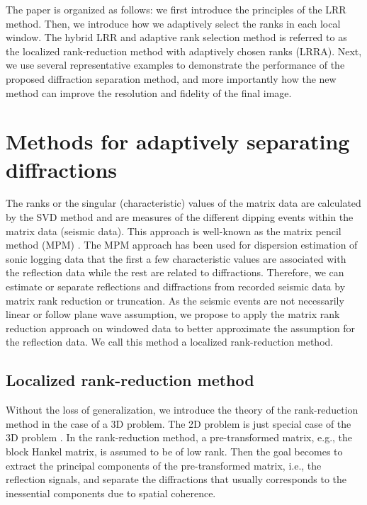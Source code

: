 The paper is organized as follows: we first introduce the principles of the LRR method. Then, we introduce how we adaptively select the ranks in each local window. The hybrid LRR and adaptive rank selection method is referred to as the localized rank-reduction method with adaptively chosen ranks (LRRA). Next, we use several representative examples to demonstrate the performance of the proposed diffraction separation method, and more importantly how the new method can improve the resolution and fidelity of the final image. 

\section{Methods for adaptively separating diffractions}
The ranks or the singular (characteristic) values of the matrix data are calculated by the SVD method and are measures of the different dipping events within the matrix data (seismic data). This approach is well-known as the matrix pencil method (MPM) \cite[]{jain1974filter,hua1991svd,sarkar1995using}. The MPM approach has been used for dispersion estimation of sonic logging data \cite[]{lang1987estimating,ekstrom1996dispersion} that the first a few characteristic values are associated with the reflection data while the rest are related to diffractions. Therefore, we can estimate or separate reflections and diffractions from recorded seismic data by matrix rank reduction or truncation. As the seismic events are not necessarily linear or follow plane wave assumption, we propose to apply the matrix rank reduction approach on windowed data to better approximate the  assumption for the reflection data. We call this method a localized rank-reduction method.
\subsection{Localized rank-reduction method}
%
Without the loss of generalization, we introduce the theory of the rank-reduction method in the case of a 3D problem. The 2D problem is just special case of the 3D problem . In the rank-reduction method, a pre-transformed matrix, e.g., the block Hankel matrix, is assumed to be of low rank. Then the goal becomes to extract the principal components of the pre-transformed matrix, i.e., the reflection signals, and separate the diffractions that usually corresponds to the inessential components due to  spatial coherence.

